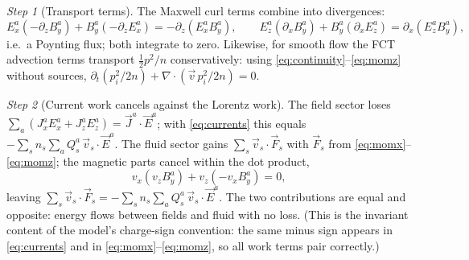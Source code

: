 \documentclass[11pt,a4paper]{article}
\numberwithin{equation}{section}
\theoremstyle{remark}
\newtheorem{step}{Step}[subsection]
\begin{document}
\begin{step}[Transport terms]
The Maxwell curl terms combine into divergences:
\begin{equation}
E_x^a(-\partial_zB_y^a)+B_y^a(-\partial_zE_x^a)=-\partial_z(E_x^aB_y^a),
\qquad
E_z^a(\partial_xB_y^a)+B_y^a(\partial_xE_z^a)=\partial_x(E_z^aB_y^a),
\end{equation}
i.e.\ a Poynting flux; both integrate to zero. Likewise, for smooth flow
the FCT advection terms transport $\tfrac12p^2/n$ conservatively:
using \eqref{eq:continuity}--\eqref{eq:momz} without sources,
$\partial_t(p_i^2/2n)+\nabla\!\cdot(\vec v\,p_i^2/2n)=0$.
\end{step}

\begin{step}[Current work cancels against the Lorentz work]
The field sector loses $\sum_a(J_x^aE_x^a+J_z^aE_z^a)=\vec J^a\!\cdot\vec
E^a$; with \eqref{eq:currents} this equals
$-\sum_s n_s\sum_aQ_s^a\,\vec v_s\!\cdot\vec E^a$. The fluid sector gains
$\sum_s\vec v_s\cdot\vec F_s$ with $\vec F_s$ from
\eqref{eq:momx}--\eqref{eq:momz}; the magnetic parts cancel within the dot
product,
\begin{equation}
v_x(v_zB_y^a)+v_z(-v_xB_y^a)=0,
\end{equation}
leaving $\sum_s\vec v_s\cdot\vec F_s
=-\sum_sn_s\sum_aQ^a_s\,\vec v_s\!\cdot\!\vec E^a$. The two contributions are
equal and opposite: energy flows between fields and fluid with no loss.
(This is the invariant content of the model's charge-sign convention: the
same minus sign appears in \eqref{eq:currents} and in
\eqref{eq:momx}--\eqref{eq:momz}, so all work terms pair correctly.)
\end{step}
\end{document}
